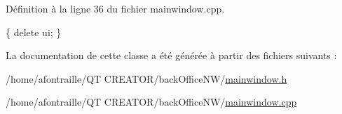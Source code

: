 Définition à la ligne 36 du fichier mainwindow.\-cpp.


\begin{DoxyCode}
\{
    \textcolor{keyword}{delete} ui;
\}
\end{DoxyCode}


La documentation de cette classe a été générée à partir des fichiers suivants \-:\begin{DoxyCompactItemize}
\item 
/home/afontraille/\-Q\-T C\-R\-E\-A\-T\-O\-R/back\-Office\-N\-W/\hyperlink{mainwindow_8h}{mainwindow.\-h}\item 
/home/afontraille/\-Q\-T C\-R\-E\-A\-T\-O\-R/back\-Office\-N\-W/\hyperlink{mainwindow_8cpp}{mainwindow.\-cpp}\end{DoxyCompactItemize}
